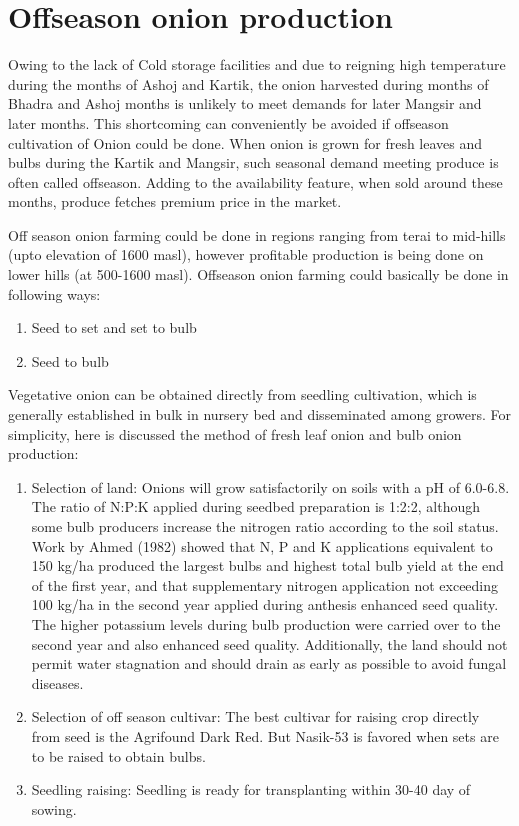 \documentclass[
  openany]{book}
\providecommand{\tightlist}{%
  \setlength{\itemsep}{0pt}\setlength{\parskip}{0pt}}
\begin{document}
\hypertarget{offseason-onion-production}{%
\section{Offseason onion production}\label{offseason-onion-production}}

Owing to the lack of Cold storage facilities and due to reigning high temperature during the months of Ashoj and Kartik, the onion harvested during months of Bhadra and Ashoj months is unlikely to meet demands for later Mangsir and later months. This shortcoming can conveniently be avoided if offseason cultivation of Onion could be done. When onion is grown for fresh leaves and bulbs during the Kartik and Mangsir, such seasonal demand meeting produce is often called offseason. Adding to the availability feature, when sold around these months, produce fetches premium price in the market.

Off season onion farming could be done in regions ranging from terai to mid-hills (upto elevation of 1600 masl), however profitable production is being done on lower hills (at 500-1600 masl). Offseason onion farming could basically be done in following ways:

\begin{enumerate}
\def\labelenumi{\arabic{enumi}.}
\tightlist
\item
  Seed to set and set to bulb
\item
  Seed to bulb
\end{enumerate}

Vegetative onion can be obtained directly from seedling cultivation, which is generally established in bulk in nursery bed and disseminated among growers. For simplicity, here is discussed the method of fresh leaf onion and bulb onion production:

\begin{enumerate}
\def\labelenumi{\arabic{enumi}.}
\tightlist
\item
  Selection of land: Onions will grow satisfactorily on soils with a pH of 6.0-6.8. The ratio of N:P:K applied during seedbed preparation is 1:2:2, although some bulb producers increase the nitrogen ratio according to the soil status. Work by Ahmed (1982) showed that N, P and K applications equivalent to 150 kg/ha produced the largest bulbs and highest total bulb yield at the end of the first year, and that supplementary nitrogen application not exceeding 100 kg/ha in the second year applied during anthesis enhanced seed quality. The higher potassium levels during bulb production were carried over to the second year and also enhanced seed quality.
  Additionally, the land should not permit water stagnation and should drain as early as possible to avoid fungal diseases.
\item
  Selection of off season cultivar: The best cultivar for raising crop directly from seed is the Agrifound Dark Red. But Nasik-53 is favored when sets are to be raised to obtain bulbs.
\item
  Seedling raising: Seedling is ready for transplanting within 30-40 day of sowing.
\end{enumerate}
\end{document}
